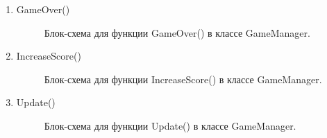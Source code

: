 \documentclass[14pt, oneside]{altsu-report}
\begin{document}
\begin{enumerate}
\item GameOver()

\begin{figure}[H]
\caption{Блок-схема для функции GameOver() в классе GameManager.}
\end{figure}

\item IncreaseScore()

\begin{figure}[H]
\caption{Блок-схема для функции IncreaseScore() в классе GameManager.}
\end{figure}

\item Update()

\begin{figure}[H]
\caption{Блок-схема для функции Update() в классе GameManager.}
\end{figure}

\end{enumerate}
\end{document}
